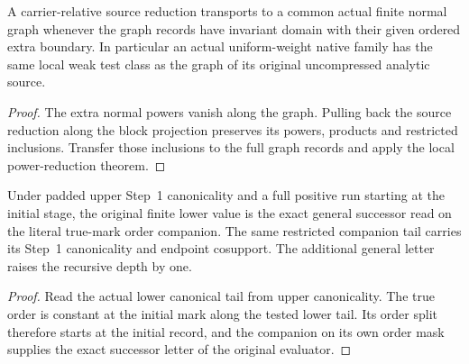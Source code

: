 \begin{theorem}
\label{hir:g1-normal-graph-power-reduction}
\leanok
A carrier-relative source reduction transports to a common actual
finite normal graph whenever the graph records have invariant
domain with their given ordered extra boundary. In particular an
actual uniform-weight native family has the same local weak test
class as the graph of its original uncompressed analytic source.
\end{theorem}
\begin{proof}
The extra normal powers vanish along the graph. Pulling back the
source reduction along the block projection preserves its powers,
products and restricted inclusions. Transfer those inclusions to
the full graph records and apply the local power-reduction theorem.
\end{proof}

\begin{theorem}
\label{hir:g1-original-initial-positive-successor-read}
\leanok
Under padded upper Step~1 canonicality and a full positive run
starting at the initial stage, the original finite lower value is
the exact general successor read on the literal true-mark order
companion. The same restricted companion tail carries its Step~1
canonicality and endpoint cosupport. The additional general
letter raises the recursive depth by one.
\end{theorem}
\begin{proof}
Read the actual lower canonical tail from upper canonicality.
The true order is constant at the initial mark along the tested
lower tail. Its order split therefore starts at the initial record,
and the companion on its own order mask supplies the exact
successor letter of the original evaluator.
\end{proof}

